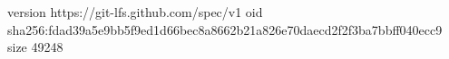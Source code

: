 version https://git-lfs.github.com/spec/v1
oid sha256:fdad39a5e9bb5f9ed1d66bec8a8662b21a826e70daecd2f2f3ba7bbff040ecc9
size 49248
